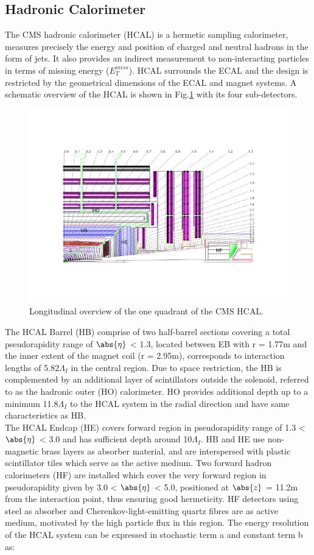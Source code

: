 \subsection{Hadronic Calorimeter}
The CMS hadronic calorimeter (HCAL) \cite{hcal} is a hermetic sampling calorimeter, measures precisely the energy and position of charged and neutral hadrons in the form of jets. It also provides an indirect measurement to non-interacting particles in terms of missing energy ($E_{T}^{miss}$). HCAL surrounds the ECAL and the design is restricted by the geometrical dimensions of the ECAL
and magnet systems. A schematic overview of the HCAL is shown in Fig.\ref{fig:hcal} with its four sub-detectors.
\begin{figure}[h!]
\centering
\includegraphics[scale=0.8, trim=90 100 80 80,clip]{fig/chapt3/HCAL.pdf}
\caption{\label{fig:hcal} Longitudinal overview of the one quadrant of the CMS HCAL.}
\end{figure}
The HCAL Barrel (HB) comprise of two half-barrel sections covering a total pseudorapidity range of $\abs{\eta}$ < 1.3, located between EB with r = 1.77m and the inner extent of the magnet coil (r = 2.95m), corresponds to interaction lengths of 5.82$\Lambda_{I}$ in the central region. Due to space restriction, the HB is complemented by an additional layer of scintillators outside the solenoid, referred to as the hadronic outer (HO) calorimeter. HO provides additional depth up to a minimum 11.8$\Lambda_{I}$ to the HCAL system in the radial direction and have same characteristics as HB. \\
The HCAL Endcap (HE) covers forward region in pseudorapidity range of 1.3 < $\abs{\eta}$ < 3.0 and has sufficient depth around 10$\Lambda_{I}$. HB and HE use non-magnetic brass layers as absorber material, and are interspersed with plastic scintillator tiles which serve as the active medium. Two forward hadron calorimeters (HF) are installed which cover the very forward region in pseudorapidity given by 3.0 < $\abs{\eta}$ < 5.0, positioned at $\abs{z}$ = 11.2m from the interaction point, thus ensuring good hermeticity. HF detectors using steel as absorber and Cherenkov-light-emitting quartz fibres are as active medium, motivated by the high particle flux in this region.  The energy resolution of the HCAL system can be expressed in stochastic term a and constant term b as:
